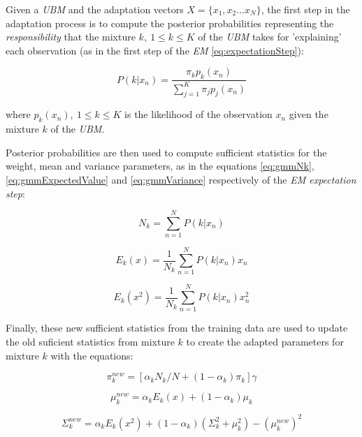 Given a \textit{UBM} and the adaptation vectors $X=\{x_{1}, x_{2} \dotsc x_{N}\}$, the first step
in the adaptation process is to compute the posterior probabilities representing the
\textit{responsibility} that the mixture $k, \ 1 \leq k \leq K$ of the \textit{UBM}
takes for 'explaining' each observation
(as in the first step of the \textit{EM} \ref{eq:expectationStep}):

\begin{equation}
P(k|x_{n}) = \frac{\pi_{k}p_{k}(x_{n})}{\sum_{j=1}^{K}\pi_{j}p_{j}(x_{n})}
\end{equation}

where $p_{k}(x_{n}), \ 1 \leq k \leq K$ is the likelihood of the observation $x_{n}$ given the
mixture $k$ of the \textit{UBM}.

Posterior probabilities are then used to compute sufficient statistics for the weight, mean
and variance parameters, as in the equations \ref{eq:gmmNk}, \ref{eq:gmmExpectedValue} and \ref{eq:gmmVariance} respectively of the \textit{EM expectation step}:

\begin{equation}
	N_{k} = \sum_{n=1}^{N}P(k|x_{n})
\end{equation}

\begin{equation}
	E_{k}(x) = \frac{1}{N_{k}}\sum_{n=1}^{N}P(k|x_{n})x_{n}
\end{equation}

\begin{equation}
	E_{k}(x^{2}) = \frac{1}{N_{k}}\sum_{n=1}^{N}P(k|x_{n})x_{n}^{2}
\end{equation}

Finally, these new sufficient statistics from the training data are used to update the old
suficient statistics from mixture $k$ to create the adapted parameters for mixture $k$ with
the equations:

\begin{equation}
	\pi_{k}^{new} = [\alpha_{k} N_{k} / N + (1-\alpha_{k}) \pi_{k}]\gamma
\end{equation}

\begin{equation}
	\mu_{k}^{new}	= \alpha_{k} E_{k}(x) + (1-\alpha_{k})\mu_{k}
\end{equation}

\begin{equation}
	\Sigma_{k}^{new} = \alpha_{k} E_{k}(x^{2}) + (1-\alpha_{k})(\Sigma_{k}^{2} + \mu_{k}^{2}) - (\mu_{k}^{new})^{2}
\end{equation}

